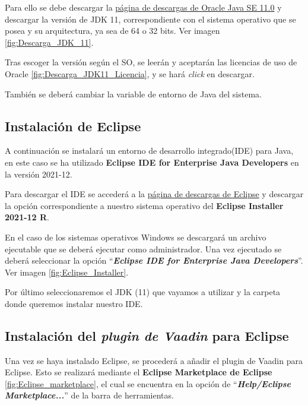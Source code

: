 Para ello se debe descargar la \href{https://www.oracle.com/es/java/technologies/javase/jdk11-archive-downloads.html}{página de descargas de Oracle Java SE 11.0} y descargar la versión de JDK 11, correspondiente con el sistema operativo que se posea y su arquitectura, ya sea de 64 o 32 bits. Ver imagen \ref{fig:Descarga_JDK_11}.

Tras escoger la versión según el SO, se leerán y aceptarán las licencias de uso de Oracle \ref{fig:Descarga_JDK11_Licencia}, y se hará \emph{click} en descargar.


También se deberá cambiar la variable de entorno de Java del sistema.



\subsection{Instalación de Eclipse}
A continuación se instalará un entorno de desarrollo integrado(IDE) para Java, en este caso se ha utilizado \textbf{Eclipse IDE for Enterprise Java Developers} en la versión 2021-12. 

Para descargar el IDE se accederá a la \href{https://www.eclipse.org/downloads/packages/release/2021-12/r}{página de descargas de Eclipse} y descargar la opción correspondiente a nuestro sistema operativo del \textbf{Eclipse Installer 2021-12 R}. 

En el caso de los sistemas operativos Windows se descargará un archivo ejecutable que se deberá ejecutar como administrador. Una vez ejecutado se deberá seleccionar la opción ``\textbf{\textit{Eclipse IDE for Enterprise Java Developers}}''. Ver imagen \ref{fig:Eclipse_Installer}. 


Por último seleccionaremos el JDK (11) que vayamos a utilizar y la carpeta donde queremos instalar nuestro IDE.

\subsection{Instalación del \textit{plugin de Vaadin} para Eclipse}
Una vez se haya instalado Eclipse, se procederá a añadir el plugin de Vaadin para Eclipse. Esto se realizará mediante el \textbf{Eclipse Marketplace de Eclipse} \ref{fig:Eclipse_marketplace}, el cual se encuentra en la opción de ``\textbf{\textit{Help/Eclipse Marketplace...}}'' de la barra de herramientas.

